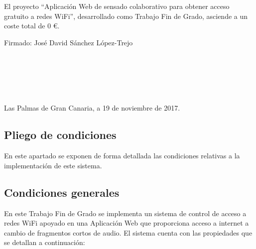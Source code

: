 El proyecto ``Aplicación Web de sensado colaborativo para obtener acceso gratuito a redes WiFi'', desarrollado como Trabajo Fin de Grado, asciende a un coste total de $0$ \euro.

\indent Firmado: José David Sánchez López-Trejo \\~ \\~ \\~ \\~ \\~
\begin{flushright}
Las Palmas de Gran Canaria, a 19 de noviembre de 2017.
\end{flushright}

\cleardoublepage
{}
\begin{center}
\begin{minipage}{.75\textwidth}
\section*{Pliego de condiciones}

En este apartado se exponen de forma detallada las condiciones relativas a la implementación de este sistema.
\end{minipage}
\end{center}
\clearpage
\subsection*{Condiciones generales}
En este Trabajo Fin de Grado se implementa un sistema de control de acceso a redes WiFi apoyado en una Aplicación Web que proporciona acceso a internet a cambio de fragmentos cortos de audio. El sistema cuenta con las propiedades que se detallan a continuación:


